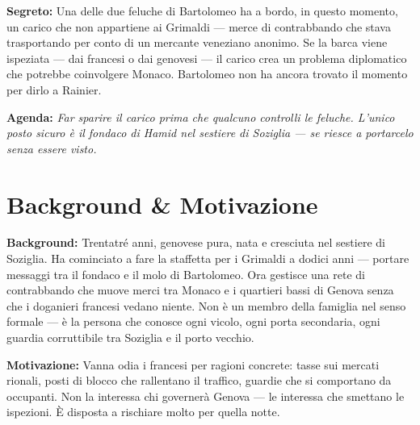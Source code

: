 \clearpage

\begin{secretbox}
  \textbf{Segreto:} Una delle due feluche di Bartolomeo ha a bordo, in questo
  momento, un carico che non appartiene ai Grimaldi — merce di contrabbando
  che stava trasportando per conto di un mercante veneziano anonimo.
  Se la barca viene ispeziata — dai francesi o dai genovesi — il carico
  crea un problema diplomatico che potrebbe coinvolgere Monaco.
  Bartolomeo non ha ancora trovato il momento per dirlo a Rainier.

  \medskip\noindent\textcolor{SecretRed}{\textbf{Agenda:}}
  \textit{Far sparire il carico prima che qualcuno controlli le feluche.
  L'unico posto sicuro è il fondaco di Hamid nel sestiere di Soziglia —
  se riesce a portarcelo senza essere visto.}
\end{secretbox}

\clearpage



\section*{Background \& Motivazione}

\begin{rulebox}{}
  \textbf{Background:} Trentatré anni, genovese pura, nata e cresciuta nel
  sestiere di Soziglia. Ha cominciato a fare la staffetta per i Grimaldi
  a dodici anni — portare messaggi tra il fondaco e il molo di Bartolomeo.
  Ora gestisce una rete di contrabbando che muove merci tra Monaco e i
  quartieri bassi di Genova senza che i doganieri francesi vedano niente.
  Non è un membro della famiglia nel senso formale — è la persona che conosce
  ogni vicolo, ogni porta secondaria, ogni guardia corruttibile tra Soziglia
  e il porto vecchio.

  \medskip\noindent\textcolor{GrimaldiPurple}{\textbf{Motivazione:}} Vanna
  odia i francesi per ragioni concrete: tasse sui mercati rionali, posti
  di blocco che rallentano il traffico, guardie che si comportano da
  occupanti. Non la interessa chi governerà Genova — le interessa che
  smettano le ispezioni. È disposta a rischiare molto per quella notte.
\end{rulebox}

